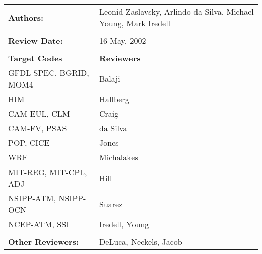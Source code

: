 
\begin{tabular}{l l}

{\bf Authors:} & Leonid Zaslavsky, Arlindo da Silva, Michael Young, Mark Iredell \\ \\

{\bf Review Date:}            & 16 May, 2002 \\ \\

{\bf Target Codes}            & {\bf Reviewers} \\
GFDL-SPEC, BGRID, MOM4        & Balaji \\ 
HIM                           & Hallberg \\
CAM-EUL, CLM                  & Craig \\
CAM-FV, PSAS                  & da Silva \\
POP, CICE                     & Jones \\
WRF                           & Michalakes \\
MIT-REG, MIT-CPL, ADJ         & Hill \\
NSIPP-ATM, NSIPP-OCN          & Suarez \\
NCEP-ATM, SSI                 & Iredell, Young \\ \\

{\bf Other Reviewers:}        & DeLuca, Neckels, Jacob

\end{tabular}


